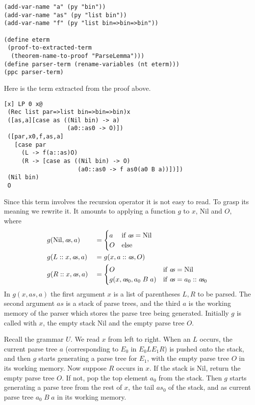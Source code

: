 \documentclass[12pt]{amsart}
\newcommand{\nil}{\mathrm{Nil}}
\newcommand{\as}{\mathit{a}\!\mathit{s}}
\begin{document}
\begin{appendix}
\begin{verbatim}
(add-var-name "a" (py "bin"))
(add-var-name "as" (py "list bin"))
(add-var-name "f" (py "list bin=>bin=>bin"))

(define eterm
 (proof-to-extracted-term
  (theorem-name-to-proof "ParseLemma")))
(define parser-term (rename-variables (nt eterm)))
(ppc parser-term)
\end{verbatim}
Here is the term extracted from the proof above.
\begin{verbatim}
[x] LP 0 x@
 (Rec list par=>list bin=>bin=>bin)x
 ([as,a][case as ((Nil bin) -> a) 
                  (a0::as0 -> O)])
 ([par,x0,f,as,a]
   [case par
     (L -> f(a::as)O)
     (R -> [case as ((Nil bin) -> O) 
                     (a0::as0 -> f as0(a0 B a))])])
 (Nil bin)
 O
\end{verbatim}
Since this term involves the recursion operator it is not easy to
read.  To grasp its meaning we rewrite it.  It amounts to applying a
function $g$ to $x$, $\nil$ and $O$, where
\begin{alignat*}{2}
  &g(\nil,\as,a) &&=
  \begin{cases}
    a &\hbox{if $\as = \nil$}
    \\
    O &\hbox{else}
  \end{cases}
  \\
  &g(L::x,\as,a) &&=g(x,a::\as,O)
  \\
  &g(R::x,\as,a) &&=
  \begin{cases}
    O &\hbox{if $\as = \nil$}
    \\
    g(x,\as_0,a_0\;B\;a) &\hbox{if $\as=a_0::\as_0$}
  \end{cases}
\end{alignat*}
In $g(x,\as,a)$ the first argument $x$ is a list of parentheses $L,R$
to be parsed.  The second argument $\as$ is a stack of parse trees,
and the third $a$ is the working memory of the parser which stores the
parse tree being generated.  Initially $g$ is called with $x$, the
empty stack $\nil$ and the empty parse tree $O$.

Recall the grammar $U$.  We read $x$ from left to right.  When an $L$
occurs, the current parse tree $a$ (corresponding to $E_0$ in $E_0 L
E_1 R$) is pushed onto the stack, and then $g$ starts generating a
parse tree for $E_1$, with the empty parse tree $O$ in its working
memory.  Now suppose $R$ occurs in $x$.  If the stack is $\nil$,
return the empty parse tree $O$.  If not, pop the top element $a_0$
from the stack.  Then $g$ starts generating a parse tree from the rest
of $x$, the tail $\as_0$ of the stack, and as current parse tree $a_0
\; B \; a$ in its working memory.


\end{appendix}
\end{document}
